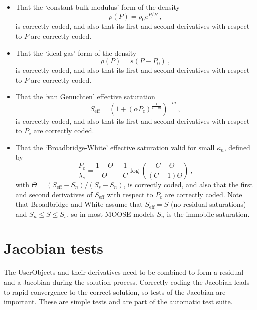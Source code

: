 \documentclass[]{scrreprt}
\begin{document}
\begin{itemize}
\item That the `constant bulk modulus' form of the density
\begin{equation}
\rho(P) = \rho_{0}e^{P/B} \ ,
\end{equation}
is correctly coded, and also that its first and second derivatives
with respect to $P$ are correctly coded.

\item That the `ideal gas' form of the density
\begin{equation}
\rho(P) = s(P-P_{\mathrm{0}}) \ ,
\end{equation}
is correctly coded, and also that its first and second derivatives
with respect to $P$ are correctly coded.

\item That the `van Genuchten' effective saturation
\begin{equation}
S_{\mathrm{eff}} = \left(1 + (\alpha
P_{\mathrm{c}})^{\frac{1}{1-m}}\right)^{-m} \ ,
\end{equation}
is correctly coded, and also that its first and second derivatives
with respect to $P_{\mathrm{c}}$ are correctly coded.

\item That the `Broadbridge-White' effective saturation valid for
  small $\kappa_{n}$, defined by
\begin{equation}
\frac{P_{\mathrm{c}}}{\lambda_{s}} = \frac{1-\Theta}{\Theta} - \frac{1}{C}\log
\left( \frac{C-\Theta}{(C-1)\Theta} \right) \ ,
\end{equation}
with $\Theta = (S_{\mathrm{eff}} - S_{n})/(S_{s}-S_{n})$, 
is correctly coded, and also that the first and second derivatives of
$S_{\mathrm{eff}}$ with respect to $P_{\mathrm{c}}$ are correctly
coded.  Note that Broadbridge and White assume that
$S_{\mathrm{eff}}=S$ (no residual saturations) and $S_{n}\leq S \leq
S_{s}$, so in most MOOSE models $S_{n}$ is the immobile saturation.

\end{itemize}



\chapter{Jacobian tests}
\label{jac}

The UserObjects and their derivatives need to be combined to form a
residual and a Jacobian during the solution process.  Correctly coding
the Jacobian leads to rapid convergence to the correct solution, so
tests of the Jacobian are important.  These are simple tests and are
part of the automatic test suite.
\end{document}
